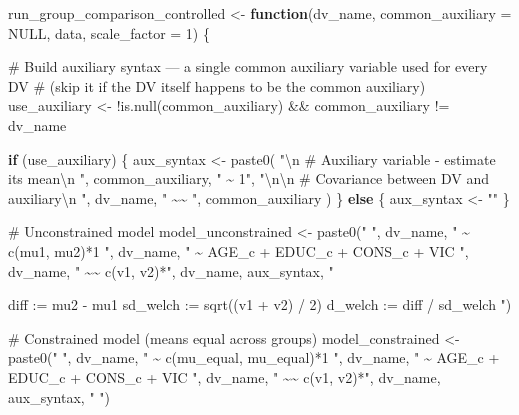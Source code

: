\documentclass[
  letterpaper,
  DIV=11,
  numbers=noendperiod]{scrreprt}
\newenvironment{Shaded}{\begin{snugshade}}{\end{snugshade}}
\newcommand{\AttributeTok}[1]{\textcolor[rgb]{0.40,0.45,0.13}{#1}}
\newcommand{\CommentTok}[1]{\textcolor[rgb]{0.37,0.37,0.37}{#1}}
\newcommand{\ConstantTok}[1]{\textcolor[rgb]{0.56,0.35,0.01}{#1}}
\newcommand{\ControlFlowTok}[1]{\textcolor[rgb]{0.00,0.23,0.31}{\textbf{#1}}}
\newcommand{\DecValTok}[1]{\textcolor[rgb]{0.68,0.00,0.00}{#1}}
\newcommand{\FunctionTok}[1]{\textcolor[rgb]{0.28,0.35,0.67}{#1}}
\newcommand{\NormalTok}[1]{\textcolor[rgb]{0.00,0.23,0.31}{#1}}
\newcommand{\OtherTok}[1]{\textcolor[rgb]{0.00,0.23,0.31}{#1}}
\newcommand{\SpecialCharTok}[1]{\textcolor[rgb]{0.37,0.37,0.37}{#1}}
\newcommand{\StringTok}[1]{\textcolor[rgb]{0.13,0.47,0.30}{#1}}
\begin{document}
\begin{Shaded}
\begin{Highlighting}[]
\NormalTok{run\_group\_comparison\_controlled }\OtherTok{\textless{}{-}} \ControlFlowTok{function}\NormalTok{(dv\_name, }\AttributeTok{common\_auxiliary =} \ConstantTok{NULL}\NormalTok{, data,}
                                            \AttributeTok{scale\_factor =} \DecValTok{1}\NormalTok{) \{}
  
  \CommentTok{\# Build auxiliary syntax — a single common auxiliary variable used for every DV}
  \CommentTok{\# (skip it if the DV itself happens to be the common auxiliary)}
\NormalTok{  use\_auxiliary }\OtherTok{\textless{}{-}} \SpecialCharTok{!}\FunctionTok{is.null}\NormalTok{(common\_auxiliary) }\SpecialCharTok{\&\&}\NormalTok{ common\_auxiliary }\SpecialCharTok{!=}\NormalTok{ dv\_name}
  
  \ControlFlowTok{if}\NormalTok{ (use\_auxiliary) \{}
\NormalTok{    aux\_syntax }\OtherTok{\textless{}{-}} \FunctionTok{paste0}\NormalTok{(}
      \StringTok{"}\SpecialCharTok{\textbackslash{}n}\StringTok{  \# Auxiliary variable {-} estimate its mean}\SpecialCharTok{\textbackslash{}n}\StringTok{  "}\NormalTok{,}
\NormalTok{      common\_auxiliary, }\StringTok{" \textasciitilde{} 1"}\NormalTok{,}
      \StringTok{"}\SpecialCharTok{\textbackslash{}n\textbackslash{}n}\StringTok{  \# Covariance between DV and auxiliary}\SpecialCharTok{\textbackslash{}n}\StringTok{  "}\NormalTok{,}
\NormalTok{      dv\_name, }\StringTok{" \textasciitilde{}\textasciitilde{} "}\NormalTok{, common\_auxiliary}
\NormalTok{    )}
\NormalTok{  \} }\ControlFlowTok{else}\NormalTok{ \{}
\NormalTok{    aux\_syntax }\OtherTok{\textless{}{-}} \StringTok{""}
\NormalTok{  \}}
  
  \CommentTok{\# Unconstrained model}
\NormalTok{  model\_unconstrained }\OtherTok{\textless{}{-}} \FunctionTok{paste0}\NormalTok{(}\StringTok{"}
\StringTok{  "}\NormalTok{, dv\_name, }\StringTok{" \textasciitilde{} c(mu1, mu2)*1}
\StringTok{  "}\NormalTok{, dv\_name, }\StringTok{" \textasciitilde{} AGE\_c + EDUC\_c + CONS\_c + VIC}
\StringTok{  "}\NormalTok{, dv\_name, }\StringTok{" \textasciitilde{}\textasciitilde{} c(v1, v2)*"}\NormalTok{, dv\_name, aux\_syntax, }\StringTok{"}

\StringTok{  diff     := mu2 {-} mu1}
\StringTok{  sd\_welch := sqrt((v1 + v2) / 2)}
\StringTok{  d\_welch  := diff / sd\_welch}
\StringTok{"}\NormalTok{)}
  
  \CommentTok{\# Constrained model (means equal across groups)}
\NormalTok{  model\_constrained }\OtherTok{\textless{}{-}} \FunctionTok{paste0}\NormalTok{(}\StringTok{"}
\StringTok{  "}\NormalTok{, dv\_name, }\StringTok{" \textasciitilde{} c(mu\_equal, mu\_equal)*1}
\StringTok{  "}\NormalTok{, dv\_name, }\StringTok{" \textasciitilde{} AGE\_c + EDUC\_c + CONS\_c + VIC}
\StringTok{  "}\NormalTok{, dv\_name, }\StringTok{" \textasciitilde{}\textasciitilde{} c(v1, v2)*"}\NormalTok{, dv\_name, aux\_syntax, }\StringTok{"}
\StringTok{"}\NormalTok{)}
  

\end{Highlighting}
\end{Shaded}
\end{document}
